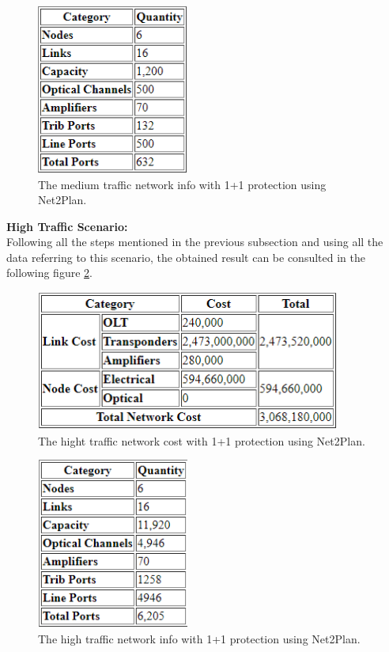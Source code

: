 \begin{figure}[h!]
\centering
\includegraphics[width=5cm]{sdf/heuristic/figures/Medium_Network_Info_Protec_Opaque}
\caption{The medium traffic network info with 1+1 protection using Net2Plan.}
\label{Medium_Network_Info_Protec_Opaque}
\end{figure}

\newpage
\textbf{High Traffic Scenario:}\\

Following all the steps mentioned in the previous subsection and using all the data referring to this scenario, the obtained result can be consulted in the following figure \ref{High_Network_Cost_Protec_Opaque}.

\begin{figure}[h!]
\centering
\includegraphics[width=10cm]{sdf/heuristic/figures/High_Network_Cost_Protec_Opaque}
\caption{The hight traffic network cost with 1+1 protection using Net2Plan.}
\label{High_Network_Cost_Protec_Opaque}
\end{figure}

\begin{figure}[h!]
\centering
\includegraphics[width=5cm]{sdf/heuristic/figures/High_Network_Info_Protec_Opaque}
\caption{The high traffic network info with 1+1 protection using Net2Plan.}
\label{High_Network_Info_Protec_Opaque}
\end{figure}

